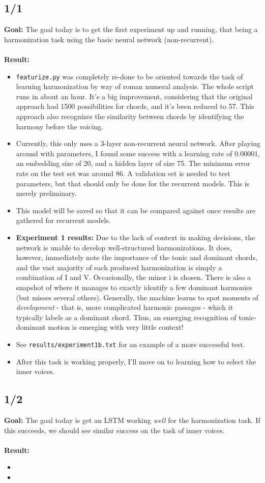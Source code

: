 \documentclass[12pt]{article}
\begin{document}
\subsection{1/1}
\textbf{Goal:} The goal today is to get the first experiment up and running, that being a harmonization task using the basic neural network (non-recurrent). \\ \\
\textbf{Result:}
\begin{itemize}
\item \texttt{featurize.py} was completely re-done to be oriented towards the task of learning harmonization by way of roman numeral analysis. The whole script runs in about an hour. It's a big improvement, considering that the original approach had 1500 possibilities for chords, and it's been reduced to 57. This approach also recognizes the similarity between chords by identifying the harmony before the voicing. 
\item Currently, this only uses a 3-layer non-recurrent neural network. After playing around with parameters, I found some success with a learning rate of 0.00001, an embedding size of 20, and a hidden layer of size 75. The minimum error rate on the test set was around 86. A validation set is needed to test parameters, but that should only be done for the recurrent models. This is merely preliminary.
\item This model will be saved so that it can be compared against once results are gathered for recurrent models.
\item \textbf{Experiment 1 results:} Due to the lack of context in making decisions, the network is unable to develop well-structured harmonizations. It does, however, immediately note the importance of the tonic and dominant chords, and the vast majority of each produced harmonization is simply a combination of I and V. Occasionally, the minor i is chosen. There is also a snapshot of where it manages to exactly identify a few dominant harmonies (but misses several others). Generally, the machine learns to spot moments of \textit{development} - that is, more complicated harmonic passages - which it typically labels as a dominant chord. Thus, an emerging recognition of tonic-dominant motion is emerging with very little context! 
\item See \texttt{results/experiment1b.txt} for an example of a more successful test.
\item After this task is working properly, I'll move on to learning how to select the inner voices.
\end{itemize}


\subsection{1/2}
\textbf{Goal:} The goal today is get an LSTM working \textit{well} for the harmonization task. If this succeeds, we should see similar success on the task of inner voices. \\ \\
\textbf{Result:}
\begin{itemize}
\item
\item
\end{itemize}
\end{document}
